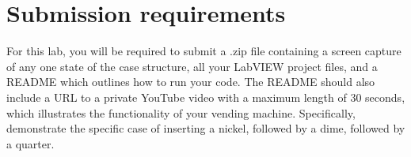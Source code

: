 \documentclass{article}
\begin{document}
\section*{Submission requirements}

For this lab, you will be required to submit a .zip file containing a screen capture of any one state of the case structure, all your LabVIEW project files, and a README which outlines how to run your code. The README should also include a URL to a private YouTube video with a maximum length of 30 seconds, which illustrates the functionality of your vending machine. Specifically, demonstrate the specific case of inserting a nickel, followed by a dime, followed by a quarter.
\end{document}
